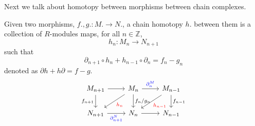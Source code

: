 Next we talk about homotopy between morphisms between chain complexes.
\begin{defn}[homotopy]
    Given two morphisms, $f.,g.:M.\to N.$, a chain homotopy $h.$ between them is a collection of $R$-modules maps, for all $n\in\mathbb{Z}$,
    \begin{equation*}
        h_n:M_n\to N_{n+1}
    \end{equation*}
    such that 
    \begin{equation*}
        \partial_{n+1}\circ h_n+h_{n-1}\circ\partial_n=f_n-g_n
    \end{equation*}
    denoted as $\partial h+h\partial=f-g$.
    \[\begin{tikzcd}
        {M_{n+1}} & {M_n} & {M_{n-1}} \\
        {N_{n+1}} & {N_n} & {N_{n-1}}
        \arrow[from=1-1, to=1-2]
        \arrow["{f_{n+1}}"', from=1-1, to=2-1]
        \arrow["{\textcolor{blue}{\partial_n^M}}", from=1-2, to=1-3]
        \arrow["{\textcolor{red}{h_n}}", from=1-2, to=2-1]
        \arrow["{f_n/g_n}", from=1-2, to=2-2]
        \arrow["{\textcolor{red}{h_{n-1}}}", from=1-3, to=2-2]
        \arrow["{f_{n-1}}", from=1-3, to=2-3]
        \arrow["{\textcolor{blue}{\partial_{n+1}^N}}"', from=2-1, to=2-2]
        \arrow[from=2-2, to=2-3]
    \end{tikzcd}\]
\end{defn} 

